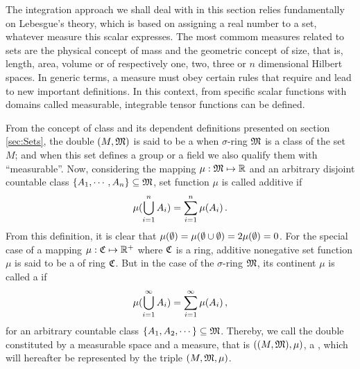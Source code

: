 The integration approach we shall deal with in this section relies fundamentally on Lebesgue's theory, which is based on assigning a real number to a set, whatever measure this scalar expresses. The most commom measures related to sets are the physical concept of mass and the geometric concept of size, that is, length, area, volume or  of respectively one, two, three or $n$ dimensional Hilbert spaces. In generic terms, a measure must obey certain rules that require and lead to new important definitions. In this context, from specific scalar functions with domains called measurable, integrable tensor functions can be defined.

From the concept of class and its dependent definitions presented on section \ref{sec:Sets}, the double $(M,\mathfrak{M})$ is said to be a  when $\sigma$-ring $\mathfrak{M}$ is a class of the set $M$; and when this set defines a group or a field we also qualify them with ``measurable''. Now, considering the mapping $\mu : \mathfrak{M} \mapsto \mathbb{R}$ and an arbitrary disjoint countable class $\{A_1,\cdots,A_n\}\subseteq\mathfrak{M}$, set function $\mu$ is called additive if
\begin{equation}\label{eq:addMeasure}
\mu(\bigcup_{i=1}^nA_i)=\sum_{{i}=1}^n\mu(A_i)\,.
\end{equation}
From this definition, it is clear that $\mu(\emptyset)=\mu(\emptyset\cup\emptyset)=2\mu(\emptyset)=0$. For the special case of a mapping $\mu : \mathfrak{C} \mapsto \mathbb{R}^+$ where $\mathfrak{C}$ is a ring, additive nonegative set function $\mu$ is said to be a  of ring $\mathfrak{C}$. But in the case of the $\sigma$-ring $\mathfrak{M}$, its continent $\mu$ is called a  if
\begin{equation}\label{eq:measuSum}
\mu(\bigcup_{i=1}^\infty A_i)=\sum_{{i}=1}^\infty\mu(A_i)\,,
\end{equation}
for an arbitrary countable class $\{A_1,A_2,\cdots\}\subseteq\mathfrak{M}$. Thereby, we call the double constituted by a measurable space and a measure, that is $((M,\mathfrak{M}),\mu)$, a , which will hereafter be represented by the triple $(M,\mathfrak{M},\mu)$.



